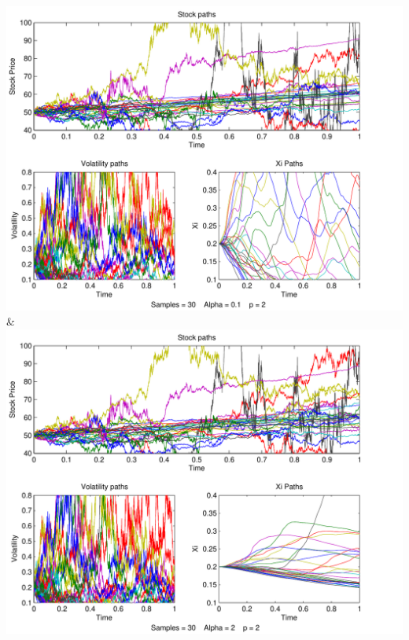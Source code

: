 \documentclass[a4paper,onecolumn]{IEEEtran}
\begin{document}
{		 \includegraphics[width=\stockplotsize]{path_s30_a0-1_p2}&
			\includegraphics[width=\stockplotsize]{path_s30_a2_p2}\LL
			}
\end{document}
